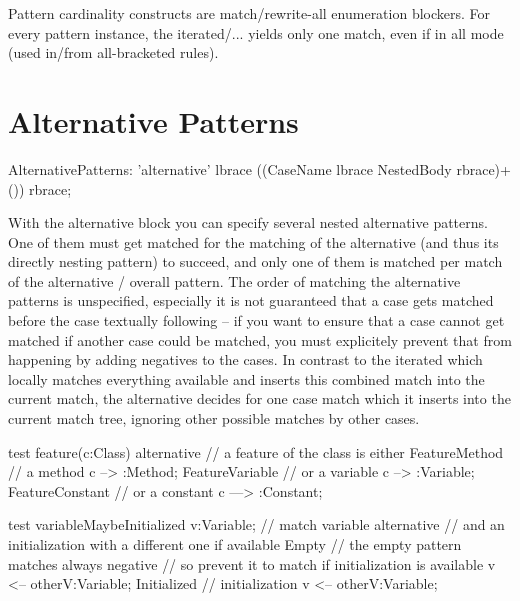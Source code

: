 \begin{warning}
Pattern cardinality constructs are match/rewrite-all enumeration blockers.
For every pattern instance, the iterated/... yields only one match, even if in all mode (used in/from all-bracketed rules).
\end{warning} 


\section{Alternative Patterns}
\label{alternative}

\begin{rail}  
  AlternativePatterns: 
    'alternative' lbrace ((CaseName lbrace NestedBody rbrace)+()) rbrace;
\end{rail}

With the alternative block you can specify several nested alternative patterns. One of them must get matched for the matching of the alternative (and thus its directly nesting pattern) to succeed, and only one of them is matched per match of the alternative / overall pattern.
The order of matching the alternative patterns is unspecified, especially it is not guaranteed that a case gets matched before the case textually following -- if you want to ensure that a case cannot get matched if another case could be matched, you must explicitely prevent that from happening by adding negatives to the cases.
In contrast to the iterated which locally matches everything available and inserts this combined match into the current match, the alternative decides for one case match which it inserts into the current match tree, ignoring other possible matches by other cases. 

\begin{example}
  \begin{grgen}
test feature(c:Class)
{
  alternative // a feature of the class is either
  {
    FeatureMethod { // a method
      c --> :Method;
    }
    FeatureVariable { // or a variable
      c --> :Variable;
    }
    FeatureConstant { // or a constant
      c ---> :Constant;
    }
  }
}  
  \end{grgen}
\end{example}

\begin{example}
  \begin{grgen}
test variableMaybeInitialized
{
  v:Variable; // match variable
  alternative { // and an initialization with a different one if available
    Empty {
      // the empty pattern matches always
      negative { // so prevent it to match if initialization is available
        v <-- otherV:Variable;
      }
    }
    Initialized { // initialization
      v <-- otherV:Variable;
    }
  }
}
  \end{grgen}
\end{example}

